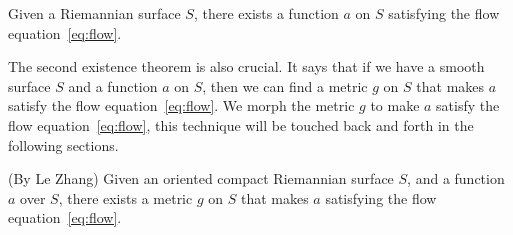 \begin{theorem}
    Given a Riemannian surface $S$, there exists a function $a$ on $S$ satisfying the flow equation~\eqref{eq:flow}.
    \label{prop:existence1st}
\end{theorem}

The second existence theorem is also crucial.
It says that if we have a smooth surface $S$ and a function $a$ on $S$, then we can find a metric $g$ on $S$ that makes $a$ satisfy the flow equation~\eqref{eq:flow}.
We morph the metric $g$ to make $a$ satisfy the flow equation~\eqref{eq:flow}, this technique will be touched back and forth in the following sections.

\begin{theorem}(By Le Zhang)
    Given an oriented compact Riemannian surface $S$, and a function $a$ over $S$, there exists a metric $g$ on $S$ that makes $a$
    satisfying the flow equation~\eqref{eq:flow}.
    \label{prop:existence2nd}
\end{theorem}


